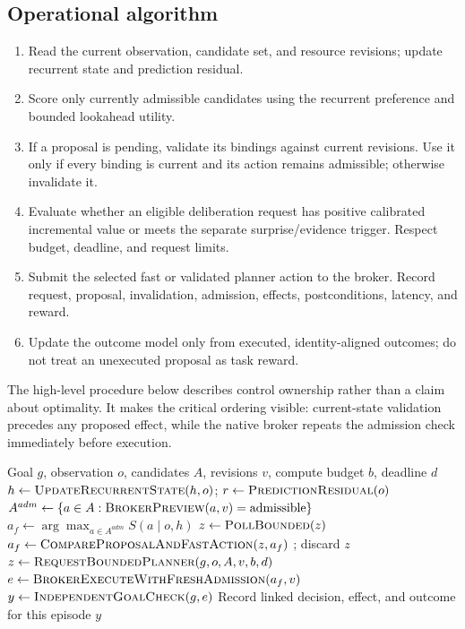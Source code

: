 \documentclass[11pt]{article}
\begin{document}
\subsection{Operational algorithm}
\begin{enumerate}[leftmargin=*]
\item Read the current observation, candidate set, and resource revisions; update recurrent state and prediction residual.
\item Score only currently admissible candidates using the recurrent preference and bounded lookahead utility.
\item If a proposal is pending, validate its bindings against current revisions. Use it only if every binding is current and its action remains admissible; otherwise invalidate it.
\item Evaluate whether an eligible deliberation request has positive calibrated incremental value or meets the separate surprise/evidence trigger. Respect budget, deadline, and request limits.
\item Submit the selected fast or validated planner action to the broker. Record request, proposal, invalidation, admission, effects, postconditions, latency, and reward.
\item Update the outcome model only from executed, identity-aligned outcomes; do not treat an unexecuted proposal as task reward.
\end{enumerate}

The high-level procedure below describes control ownership rather than a claim about optimality. It makes the critical ordering visible: current-state validation precedes any proposed effect, while the native broker repeats the admission check immediately before execution.
\begin{algorithm}[H]
\caption{Bounded action selection with revision-bound planner proposals}
\label{alg:m12}
\begin{algorithmic}[1]
\Require Goal $g$, observation $o$, candidates $A$, revisions $v$, compute budget $b$, deadline $d$
\State $h \gets \Call{UpdateRecurrentState}{h,o}$; $r \gets \Call{PredictionResidual}{o}$
\State $A^{adm} \gets \{a\in A: \Call{BrokerPreview}{a,v}=\text{admissible}\}$
 \State \Return {} \EndIf
\State $a_f \gets \arg\max_{a\in A^{adm}} S(a\mid o,h)$
  \State $z \gets \Call{PollBounded}{z}$
    \State $a_f \gets \Call{CompareProposalAndFastAction}{z,a_f}$
  \Else
    \State {}; \State discard $z$
  \EndIf
\EndIf
{}
  \State $z \gets \Call{RequestBoundedPlanner}{g,o,A,v,b,d}$
\EndIf
\State $e \gets \Call{BrokerExecuteWithFreshAdmission}{a_f,v}$
\State $y \gets \Call{IndependentGoalCheck}{g,e}$
\State Record linked decision, effect, and outcome for this episode
\State \Return $y$
\end{algorithmic}
\end{algorithm}
\end{document}

